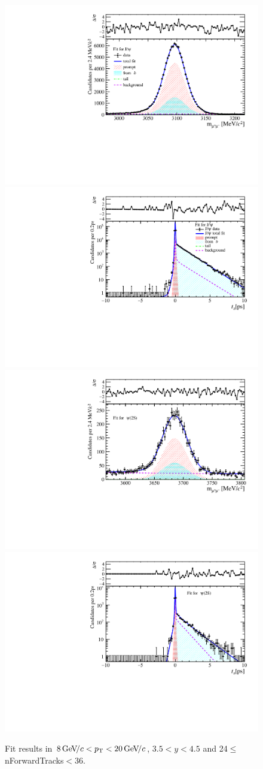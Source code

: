 \begin{figure}[H]
\begin{center}
\includegraphics[width=0.47\linewidth]{pdf/Jpsi/drawmassF/n3y3pt5.pdf}
\includegraphics[width=0.47\linewidth]{pdf/Jpsi/2DFitF/n3y3pt5.pdf}
\vspace*{-0.5cm}
\includegraphics[width=0.47\linewidth]{pdf/Psi2S/drawmassF/n3y3pt5.pdf}
\includegraphics[width=0.47\linewidth]{pdf/Psi2S/2DFitF/n3y3pt5.pdf}
\vspace*{-0.5cm}
\end{center}
\caption{Fit results in $8\text{\,Ge\kern -0.1em V\!/}c<p_{\mathrm{T}}<20\text{\,Ge\kern -0.1em V\!/}c$, $3.5<y<4.5$ and 24$\leq$nForwardTracks$<$36.}
\label{Fitn3y3pt5}
\end{figure}
